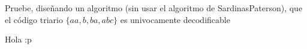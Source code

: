 
Pruebe, diseñando un algoritmo (sin usar el algoritmo de SardinasPaterson), que el código triario $\{aa, b, ba, abc\}$ es univocamente decodificable
\begin{sol}
    Hola :p
\end{sol}
